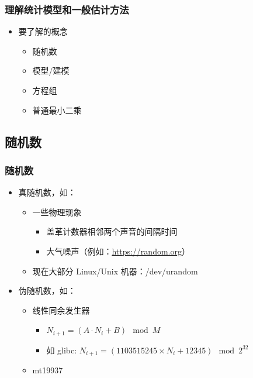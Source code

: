 \documentclass[serif,aspectratio=169]{beamer}
\begin{document}
\begin{frame}
  \frametitle{理解统计模型和一般估计方法}
  \begin{itemize}
  \item 要了解的概念
    \begin{itemize}
    \item 随机数
    \item 模型/建模
    \item 方程组
    \item 普通最小二乘
    \end{itemize}
  \end{itemize}
\end{frame}


\subsection{随机数}
\begin{frame}
  \frametitle{随机数}
  \begin{itemize}
  \item 真随机数，如：
    \begin{itemize}
    \item 一些物理现象
      \begin{itemize}
      \item 盖革计数器相邻两个声音的间隔时间
      \item 大气噪声（例如：\url{https://random.org}）
      \end{itemize}
    \item 现在大部分 Linux/Unix 机器：/dev/urandom
    \end{itemize}
  \item 伪随机数，如：
    \begin{itemize}
    \item 线性同余发生器
      \begin{itemize}
      \item $N_{i+1} = (A\cdot N_i+B) \mod M$
      \item 如 glibc: $N_{i+1} = (1103515245\times N_i+12345)\mod 2^{32}$
      \end{itemize}
    \item mt19937
    \end{itemize}
  \end{itemize}
\end{frame}
\end{document}
